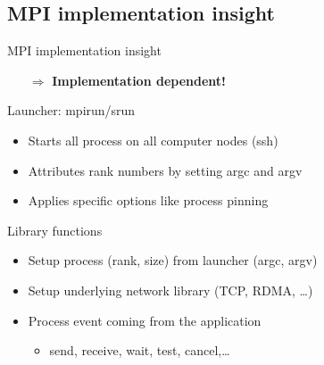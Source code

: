 \documentclass[aspectratio=43]{beamer}
\begin{document}
\subsection{MPI implementation insight}
\begin{frame}{MPI implementation insight}
\begin{itemize}
    \item[\color{cscsred}$\Rightarrow$]\textbf{\color{cscsred}Implementation dependent!}
\end{itemize}

\begin{blue1block}{Launcher: mpirun/srun}
\begin{itemize}
    \item Starts all process on all computer nodes (ssh)
    \item Attributes rank numbers by setting argc and argv
    \item Applies specific options like process pinning
\end{itemize}
\end{blue1block}

\begin{blue1block}{Library functions}
\begin{itemize}
    \item Setup process (rank, size) from launcher (argc, argv)
    \item Setup underlying network library (TCP, RDMA, \ldots)
    \item Process event coming from the application
        \begin{itemize}
        \item send, receive, wait, test, cancel,\ldots
        \end{itemize}
\end{itemize}
\end{blue1block}

\end{frame}
\end{document}
